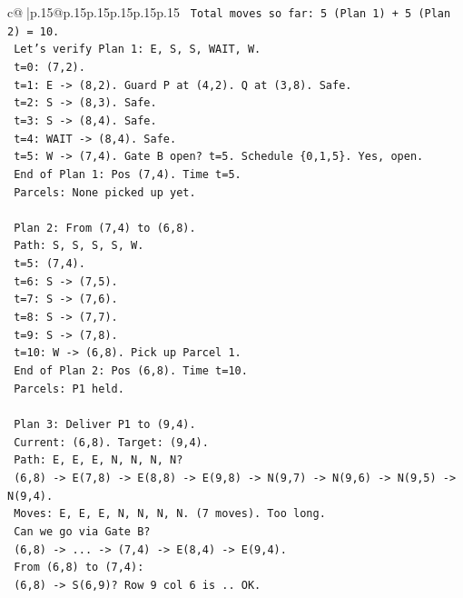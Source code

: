 \documentclass{article}
\begin{document}
{\begin{supertabular}{c@{$\;$}|p{.15\linewidth}@{}p{.15\linewidth}p{.15\linewidth}p{.15\linewidth}p{.15\linewidth}p{.15\linewidth}}
{{{\texttt{    Total moves so far: 5 (Plan 1) + 5 (Plan 2) = 10.} \\
\texttt{    Let's verify Plan 1: E, S, S, WAIT, W.} \\
\texttt{    t=0: (7,2).} \\
\texttt{    t=1: E {-}> (8,2). Guard P at (4,2). Q at (3,8). Safe.} \\
\texttt{    t=2: S {-}> (8,3). Safe.} \\
\texttt{    t=3: S {-}> (8,4). Safe.} \\
\texttt{    t=4: WAIT {-}> (8,4). Safe.} \\
\texttt{    t=5: W {-}> (7,4). Gate B open? t=5. Schedule \{0,1,5\}. Yes, open.} \\
\texttt{    End of Plan 1: Pos (7,4). Time t=5.} \\
\texttt{    Parcels: None picked up yet.} \\
\\ 
\texttt{    Plan 2: From (7,4) to (6,8).} \\
\texttt{    Path: S, S, S, S, W.} \\
\texttt{    t=5: (7,4).} \\
\texttt{    t=6: S {-}> (7,5).} \\
\texttt{    t=7: S {-}> (7,6).} \\
\texttt{    t=8: S {-}> (7,7).} \\
\texttt{    t=9: S {-}> (7,8).} \\
\texttt{    t=10: W {-}> (6,8). Pick up Parcel 1.} \\
\texttt{    End of Plan 2: Pos (6,8). Time t=10.} \\
\texttt{    Parcels: P1 held.} \\
\\ 
\texttt{    Plan 3: Deliver P1 to (9,4).} \\
\texttt{    Current: (6,8). Target: (9,4).} \\
\texttt{    Path: E, E, E, N, N, N, N?} \\
\texttt{    (6,8) {-}> E(7,8) {-}> E(8,8) {-}> E(9,8) {-}> N(9,7) {-}> N(9,6) {-}> N(9,5) {-}> N(9,4).} \\
\texttt{    Moves: E, E, E, N, N, N, N. (7 moves). Too long.} \\
\texttt{    Can we go via Gate B?} \\
\texttt{    (6,8) {-}> ... {-}> (7,4) {-}> E(8,4) {-}> E(9,4).} \\
\texttt{    From (6,8) to (7,4):} \\
\texttt{    (6,8) {-}> S(6,9)? Row 9 col 6 is .. OK.} \\
}}}
\end{supertabular}}
\end{document}
